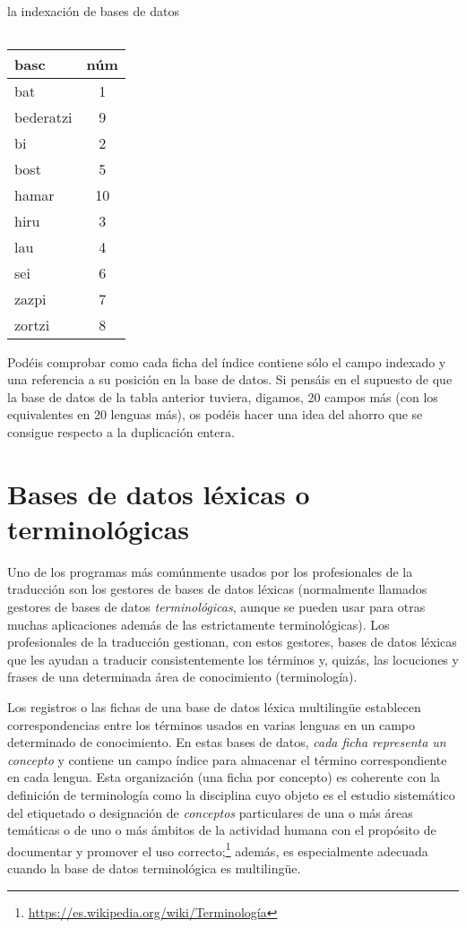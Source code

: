 \begin{persabermes}{la indexación de bases de datos}
\begin{center}
{\begin{tabular}{lc}
\end{tabular}} \hspace{0.2\textwidth} \parbox{0.25\textwidth}{ \begin{tabular}{lc} \hline

{\sc basc\phantom{o-croat}} &{\sc núm} \\ \hline

\hline

bat &1 \\ bederatzi &9 \\ bi &2 \\ bost &5 \\ hamar &10 \\ hiru &3 \\ lau &4 \\ sei &6 \\ zazpi &7 \\ zortzi &8 \\ \hline

\end{tabular}} \end{center} Podéis comprobar como cada ficha del índice contiene sólo el campo indexado y una referencia a su posición en la base de datos. Si pensáis en el supuesto de que la base de datos de la tabla anterior tuviera, digamos, 20 campos más (con los equivalentes en 20 lenguas más), os podéis hacer una idea del ahorro que se consigue respecto a la duplicación entera. \end{persabermes} 

%
\section{Bases de datos léxicas o terminológicas} \label{ss:bdterm} 

Uno de los programas más comúnmente usados por los profesionales de la traducción son los gestores de bases de datos léxicas (normalmente llamados gestores de bases de datos \emph{terminológicas}, aunque se pueden usar para otras muchas aplicaciones además de las estrictamente terminológicas). Los profesionales de la traducción gestionan, con estos gestores, bases de datos léxicas que les ayudan a traducir consistentemente los términos y, quizás, las locuciones y frases de una determinada área de conocimiento (terminología). 

Los registros o las fichas de una base de datos léxica multilingüe establecen correspondencias entre los términos usados en varias lenguas en un campo determinado de conocimiento. En estas bases de datos, \emph{cada ficha representa un concepto} y contiene un campo índice para almacenar el término correspondiente en cada lengua. Esta organización (una ficha por concepto) es coherente con la definición de terminología como la disciplina cuyo objeto es el estudio sistemático del etiquetado o designación de \emph{conceptos} particulares de una o más áreas temáticas o de uno o más ámbitos de la actividad humana con el propósito de documentar y promover el uso correcto;\footnote{\url{https://es.wikipedia.org/wiki/Terminología}} además, es especialmente adecuada cuando la base de datos terminológica es multilingüe. 

